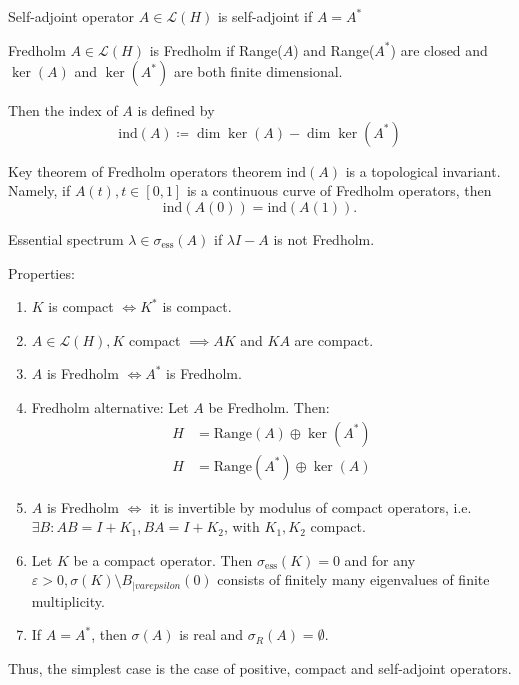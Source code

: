 \documentclass{report}
\begin{document}
\begin{definition}{Self-adjoint operator}{}
    \(A \in \mathcal{L}(H)\) is self-adjoint if \(A = A^{*}\) 
\end{definition}

\begin{definition}{Fredholm}{}
    \(A \in \mathcal{L}(H)\) is Fredholm if Range(\(A\)) and Range(\(A^{*}\)) are closed and \(\ker(A)\) and \(\ker(A^{*})\) are both finite dimensional.

    Then the index of \(A\) is defined by 
    \[
        \text{ind}(A) \coloneqq \dim \ker(A) - \dim \ker(A^{*})
    \]
\end{definition}

\begin{theorem}{Key theorem of Fredholm operators theorem}{}
    \(\text{ind}(A)\) is a topological invariant. Namely, if \(A(t), t \in [0, 1]\) is a continuous curve of Fredholm operators, then 
    \[
        \text{ind}(A(0)) = \text{ind}(A(1)).
    \]
\end{theorem}

\begin{definition}{Essential spectrum}{}
    \(\lambda \in \sigma_{\text{ess}}(A)\) if \(\lambda I - A\) is not Fredholm.
\end{definition}

Properties:
\begin{enumerate}
    \item \(K\) is compact \(\iff K^{*}\) is compact.
    \item \(A \in \mathcal{L}(H), K \) compact \(\implies AK\) and \(KA\) are compact.
    \item \(A\) is Fredholm \(\iff A^{*}\) is Fredholm.
    \item Fredholm alternative: Let \(A\) be Fredholm. Then:
    \begin{align*}
        H &= \text{Range}(A) \oplus \ker(A^{*}) \\
        H &= \text{Range}(A^{*}) \oplus \ker(A)
    \end{align*}
    \item \(A\) is Fredholm \(\iff\) it is invertible by modulus of compact operators, i.e. \(\exists B : AB = I + K_{1}, BA = I + K_{2}\), with \(K_1, K_2\) compact.
    \item Let \(K\) be a compact operator. Then \(\sigma_{\text{ess}}(K) = 0\) and for any \(\varepsilon > 0, \sigma(K) \setminus B_{|varepsilon}(0)\) consists of finitely many eigenvalues of finite multiplicity.
    \item If \(A = A^{*}\), then \(\sigma(A)\) is real and \(\sigma_{R}(A) = \emptyset\).
\end{enumerate}
Thus, the simplest case is the case of positive, compact and self-adjoint operators.
\end{document}
